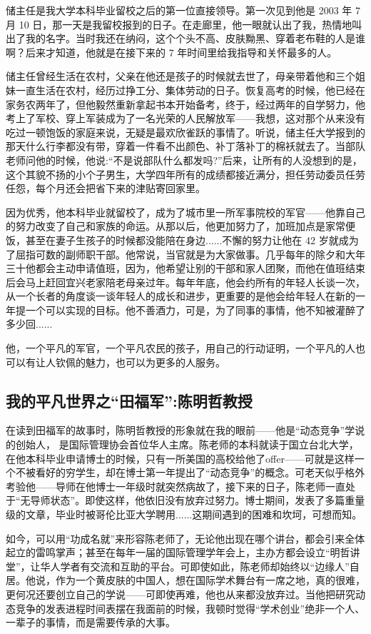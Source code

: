 \documentclass[openany,scheme = chinese, linespread = 1.5]{ctexbook}
\begin{document}
储主任是我大学本科毕业留校之后的第一位直接领导。第一次见到他是 2003 年 7 月 10 日，那一天是我留校报到的日子。在走廊里，他一眼就认出了我，热情地叫出了我的名字。当时我还在纳闷，这个个头不高、皮肤黝黑、穿着老布鞋的人是谁啊？后来才知道，他就是在接下来的 7 年时间里给我指导和关怀最多的人。 

    储主任曾经生活在农村，父亲在他还是孩子的时候就去世了，母亲带着他和三个姐妹一直生活在农村，经历过挣工分、集体劳动的日子。恢复高考的时候，他已经在家务农两年了，但他毅然重新拿起书本开始备考，终于，经过两年的自学努力，他考上了军校、穿上军装成为了一名光荣的人民解放军——我想，这对那个从来没有吃过一顿饱饭的家庭来说，无疑是最欢欣雀跃的事情了。听说，储主任大学报到的那天什么行李都没有带，穿着一件看不出颜色、补丁落补丁的棉袄就去了。当部队老师问他的时候，他说:“不是说部队什么都发吗?”后来，让所有的人没想到的是，这个其貌不扬的小个子男生，大学四年所有的成绩都接近满分，担任劳动委员任劳任怨，每个月还会把省下来的津贴寄回家里。 
    
    因为优秀，他本科毕业就留校了，成为了城市里一所军事院校的军官——他靠自己的努力改变了自己和家族的命运。从那以后，他更加努力了，加班加点是家常便饭，甚至在妻子生孩子的时候都没能陪在身边......不懈的努力让他在 42 岁就成为了屈指可数的副师职干部。他常说，当官就是为大家做事。几乎每年的除夕和大年三十他都会主动申请值班，因为，他希望让别的干部和家人团聚，而他在值班结束后会马上赶回宜兴老家陪老母亲过年。每年年底，他会约所有的年轻人长谈一次，从一个长者的角度谈一谈年轻人的成长和进步，更重要的是他会给年轻人在新的一年提一个可以实现的目标。他不善酒力，可是，为了同事的事情，他不知被灌醉了多少回...... 
    
    他，一个平凡的军官，一个平凡农民的孩子，用自己的行动证明，一个平凡的人也可以有让人钦佩的魅力，也可以为更多的人服务。 
    
\subsection*{我的平凡世界之“田福军”:陈明哲教授}

    在读到田福军的故事时，陈明哲教授的形象就在我的眼前——他是“动态竞争”学说的创始人， 是国际管理协会首位华人主席。陈老师的本科就读于国立台北大学，在他本科毕业申请博士的时候，只有一所美国的高校给他了offer——可就是这样一个不被看好的穷学生，却在博士第一年提出了“动态竞争”的概念。可老天似乎格外考验他——导师在他博士一年级时就突然病故了，接下来的日子，陈老师一直处于“无导师状态”。即使这样，他依旧没有放弃过努力。博士期间，发表了多篇重量级的文章，毕业时被哥伦比亚大学聘用......这期间遇到的困难和坎坷，可想而知。
    
    如今，可以用“功成名就”来形容陈老师了，无论他出现在哪个讲台，都会引来全体起立的雷鸣掌声；甚至在每年一届的国际管理学年会上，主办方都会设立“明哲讲堂”，让华人学者有交流和互助的平台。可即使如此，陈老师却始终以“边缘人”自居。他说，作为一个黄皮肤的中国人，想在国际学术舞台有一席之地，真的很难，更何况还要创立自己的学说——可即使再难，他也从来都没放弃过。当他把研究动态竞争的发表进程时间表摆在我面前的时候，我顿时觉得“学术创业”绝非一个人、一辈子的事情，而是需要传承的大事。 
    
\end{document}
